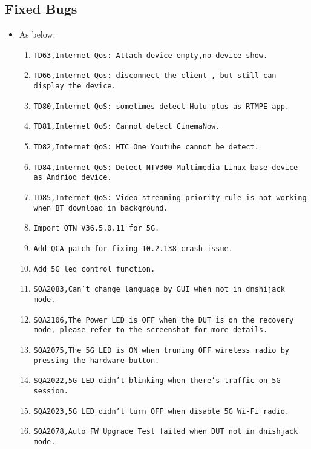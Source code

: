 \documentclass[12pt]{report}
\begin{document}
    \subsection{Fixed Bugs}
    \begin{itemize}
    \item As below:
    	\begin{enumerate}
		\item \texttt{TD63,Internet Qos: Attach device empty,no device show.}
		\item \texttt{TD66,Internet Qos: disconnect the client , but still can display the device.}
		\item \texttt{TD80,Internet QoS: sometimes detect Hulu plus as RTMPE app.}
		\item \texttt{TD81,Internet QoS: Cannot detect CinemaNow.}
		\item \texttt{TD82,Internet QoS: HTC One Youtube cannot be detect.}
		\item \texttt{TD84,Internet QoS: Detect NTV300 Multimedia Linux base device as Andriod device.}
		\item \texttt{TD85,Internet QoS: Video streaming priority rule is not working when BT download in background.}
		\item \texttt{Import QTN V36.5.0.11 for 5G.}
		\item \texttt{Add QCA patch for fixing 10.2.138 crash issue.}
		\item \texttt{Add 5G led control function.}
		\item \texttt{SQA2083,Can't change language by GUI when not in dnshijack mode.}
		\item \texttt{SQA2106,The Power LED is OFF when the DUT is on the recovery mode, please refer to the screenshot for more details.}
		\item \texttt{SQA2075,The 5G LED is ON when truning OFF wireless radio by pressing the hardware button.}
		\item \texttt{SQA2022,5G LED didn't blinking when there's traffic on 5G session.}
		\item \texttt{SQA2023,5G LED didn't turn OFF when disable 5G Wi-Fi radio.}
		\item \texttt{SQA2078,Auto FW Upgrade Test failed when DUT not in dnishjack mode.}
    	\end{enumerate}
    \end{itemize}
\end{document}
